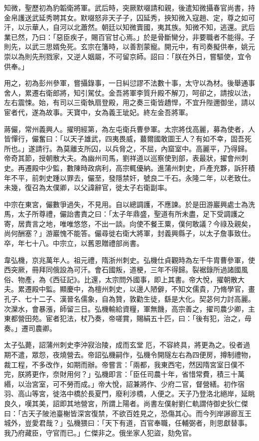 \begin{pinyinscope}
 知微，聖歷初為豹韜衛將軍。武后時，突厥默啜請和親，後遣知微攝春官尚書，持金帛護送武延秀聘其女。默啜怒非天子子，囚延秀，挾知微入寇趙、定，尊之如可汗，以示華人，自河以北蕭然。朝廷以知微賣國，夷其族。知微不知，逃還。武后業已然，乃曰：「惡臣疾子，賜百官甘心焉。」於是骨斷臠分，非要職者不能得。子則先，以武三思婿免死。玄宗在籓時，以善割蒙寵。開元中，有司奏擬供奉，姚元崇以為則先刑戮家，又逆人姻屬，不可留京師。詔曰：「朕在外日，嘗驅使，宜令供奉。」



 用之，初為彭州參軍，嘗攝錄事，一日糾愆謬不法數十事，太守以為材。後舉通事舍人，累遷右衛郎將，知引駕仗。金吾將軍李質升殿不解刀，呵卻之，請按以法，左右震悚。始，有司以三衛執扇登殿，用之奏三衛皆趫悍，不宜升陛邇御坐，請以宦者代，遂為故事。天寶中，女為義王玼妃。終左金吾將軍。



 蔣儼，常州義興人。擢明經第，為左屯衛兵曹參軍。太宗將伐高麗，募為使者，人皆憚行，儼奮曰：「以天子雄武，四夷畏威，蕞爾國敢圖王人？有如不幸，固吾死所也。」遂請行。為莫離支所囚，以兵脅之，不屈，內窟室中。高麗平，乃得歸。帝奇其節，授朝散大夫。為幽州司馬，劉祥道以巡察使到部，表最狀，擢會州刺史。再遷殿中少監，數陳時政病利，高宗輒優納。進蒲州刺史，戶產充夥，訴犴積年不平，前刺史踵以罪去，儼至，發隱禁奸，號良二千石。永隆二年，以老致仕。未幾，復召為太僕卿，以父諱辭官，徙太子右衛副率。



 中宗在東宮，儼數爭過失，不見用。自以總調護，不應諫。於是田游巖興處士為洗馬，太子所尊禮，儼詒書責之曰：「太子年鼎盛，聖道有所未盡，足下受調護之寄，居責言之地，唯唯悠悠，不出一談。向使不餐王粟，僕何敢議？今祿及親矣，尚何酬塞？」游巖愧不能答。儼尋徙右衛大將軍，封義興縣子，以太子詹事致仕。卒，年七十八。中宗立，以舊恩贈禮部尚書。



 韋弘機，京兆萬年人。祖元禮，隋浙州刺史。弘機仕貞觀時為左千牛胄曹參軍，使西突厥，冊拜同俄設為可汗。會石國叛，道梗，三年不得歸。裂裾錄所過諸國風俗、物產，為《西征記》。比還，太宗問外國事，即上其書。帝大悅，擢朝散大夫。累遷殿中監。顯慶中，為檀州刺史，以邊人陋僻，不知文儒貴，乃脩學官，畫孔子、七十二子、漢晉名儒象，自為贊，敦勸生徒，繇是大化。契苾何力討高麗。次灤水，會暴漲，師留三日。弘機輸給資糧，軍無饑，高宗善之，擢司農少卿，主東都營田苑。宦者犯法，杖乃奏，帝嗟賞，賜絹五十匹，曰：「後有犯，治之，毋奏。」遷司農卿。



 太子弘薨，詔蒲州刺史李沖寂治陵，成而玄堂厄，不容終具，將更為之。役者過期不遣，眾怨，夜燒營去。帝詔弘機嗣作，弘機令開隧左右為四便房，撙制禮物，裁工程，不多改作，如期而辦。帝嘗言：「兩都，我東西宅，然因隋宮室日僕不完，朕將更作，奈財用何？」弘機即言：「臣任司農十年，省惜常費，積三十萬緡，以治宮室，可不勞而成。」帝大悅，詔兼將作、少府二官，督營繕。初作宿羽、高山等宮，徙洛中橋於長夏門，廢利涉橋，人便之。天子乃登洛北絕岸，延眺良久，嘆其美，詔即其地營宮，所謂上陽者。尚書左僕射劉仁軌謂侍御史狄仁傑曰：「古天子陂池臺榭皆深宮復禁，不欲百姓見之，恐傷其心。而今列岸謻廊亙王城外，豈愛君哉？」弘機猥曰：「天下有道，百官奉職，任輔弼者，則思獻替事。我乃府藏臣，守官而已。」仁傑非之。俄坐家人犯盜，劾免官。




\end{pinyinscope}
